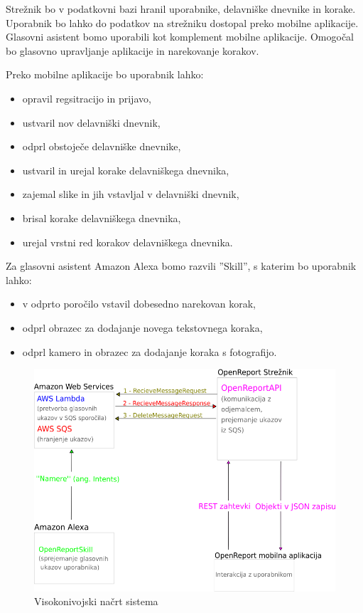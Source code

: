 \documentclass[a4paper, 12pt]{book}
\begin{document}
Strežnik bo v podatkovni bazi hranil uporabnike, delavniške dnevnike in korake.
Uporabnik bo lahko do podatkov na strežniku dostopal preko mobilne aplikacije.
Glasovni asistent bomo uporabili kot komplement mobilne aplikacije.
Omogočal bo glasovno upravljanje aplikacije in narekovanje korakov.

\noindent Preko mobilne aplikacije bo uporabnik lahko:
\begin{itemize}
	\item opravil regsitracijo in prijavo,
	\item ustvaril nov delavniški dnevnik,
	\item odprl obstoječe delavniške dnevnike,
	\item ustvaril in urejal korake delavniškega dnevnika,
	\item zajemal slike in jih vstavljal v delavniški dnevnik,
	\item brisal korake delavniškega dnevnika,
	\item urejal vrstni red korakov delavniškega dnevnika.
\end{itemize}

Za glasovni asistent Amazon Alexa bomo razvili ''Skill'', s katerim bo uporabnik lahko:

\begin{itemize}
	\item v odprto poročilo vstavil dobesedno narekovan korak,
	\item odprl obrazec za dodajanje novega tekstovnega koraka,
	\item odprl kamero in obrazec za dodajanje koraka s fotografijo.
\end{itemize}

\begin{figure}[H]
\begin{center}
\includegraphics[width=13cm]{plan}
\end{center}
\caption{Visokonivojski načrt sistema}
\label{plan}
\end{figure}
\end{document}
